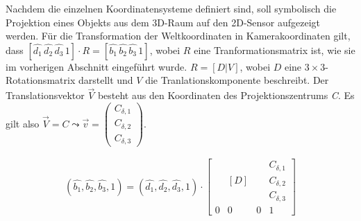 Nachdem die einzelnen Koordinatensysteme definiert sind, soll symbolisch die Projektion eines Objekts  aus dem 3D-Raum auf den 2D-Sensor aufgezeigt werden. Für die Transformation der Weltkoordinaten in Kamerakoordinaten gilt, dass $[\hat{d_1}\,\hat{d_2}\,\hat{d_3}\,1] \cdot R = [\hat{b_1}\,\hat{b_2}\, \hat{b_3}\, 1]$, wobei $R$ eine Tranformationsmatrix ist, wie sie im vorherigen Abschnitt eingeführt wurde. $R=[D|V]$, wobei $D$ eine $3 \times 3$-Rotationsmatrix darstellt und $V$ die Tranlationskomponente beschreibt. Der Translationsvektor \ensuremath{\vec{V}} besteht aus den Koordinaten des Projektionszentrums \textit{C}. Es gilt also $\vec{V} = C \leadsto \vec{v} = \begin{pmatrix}	C_{\delta,1}\\C_{\delta,2}\\C_{\delta,3}\end{pmatrix}$. 

 
\begin{gather} 		
(\hat{b_1}, \hat{b_2}, \hat{b_3},1)=(\hat{d_1},\hat{d_2},\hat{d_3},1) \cdot
\begin{bmatrix}
&  &  &C_{\delta,1} \\
&  [D]&  &C_{\delta,2} \\ 
&  &  &C_{\delta,3} \\
0&0&0 & 1
\end{bmatrix}	
\end{gather}


